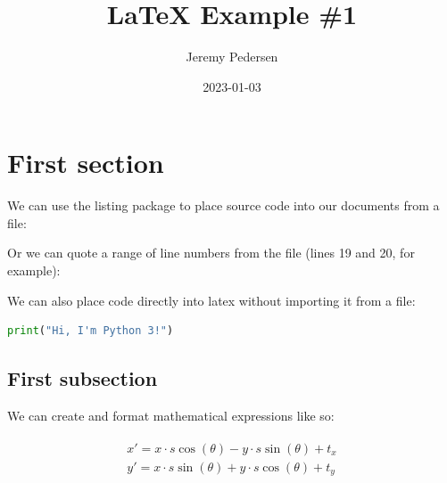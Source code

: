 \documentclass[a4paper,12pt]{article} %
\title{\LaTeX \space{} Example \#1}
\author{Jeremy Pedersen}
\date{2023-01-03} %
\begin{document}
\maketitle %

\section{First section} %

We can use the listing package to place source code into our documents from a file:

\vspace{5mm}

\vspace{5mm}

\noindent
Or we can quote a range of line numbers from the file (lines 19 and 20, for example):

\vspace{5mm}

\vspace{5mm}

\clearpage

\noindent
We can also place code directly into latex without importing it from a file:

\vspace{5mm}
\begin{lstlisting}[language=Python, caption=Python example]
print("Hi, I'm Python 3!")
\end{lstlisting}
\vspace{5mm}

\subsection{First subsection} %

We can create and format mathematical expressions like so:

\begin{align}
\label{eqn:eqlabel}
\begin{split}
x' = x \cdot s \cos\left(\theta\right) - y \cdot s \sin\left(\theta\right) + t_x
\\
y' = x \cdot s \sin\left(\theta\right) + y \cdot s \cos\left(\theta\right) + t_y
\end{split}
\end{align}
\end{document}
